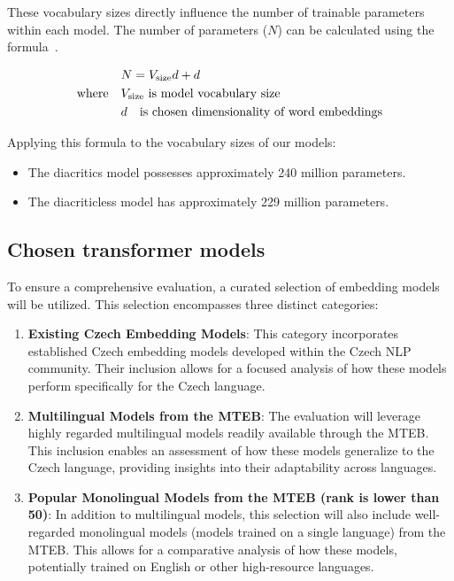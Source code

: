 These vocabulary sizes directly influence the number of trainable parameters within each model.
The number of parameters ($N$) can be calculated using the formula~.

\begin{align} \label{eq:cbow_parameters}
  & N = V_{\text{size}}d + d \\
  \text{where} \quad & V_{\text{size}} \text{ is model vocabulary size}  \notag \\
                      & d \quad \text{is chosen dimensionality of word embeddings} \notag
\end{align}
  
Applying this formula to the vocabulary sizes of our models:
\begin{itemize}
  \item The diacritics model possesses approximately 240 million parameters.
  \item The diacriticless model has approximately 229 million parameters.
\end{itemize}

\subsection{Chosen transformer models}
To ensure a comprehensive evaluation, a curated selection of embedding models will be utilized.
This selection encompasses three distinct categories:

\begin{enumerate}
  \item \textbf{Existing Czech Embedding Models}:
    This category incorporates established Czech embedding models developed within the Czech NLP community.
    Their inclusion allows for a focused analysis of how these models perform specifically for the Czech language.
  \item \textbf{Multilingual Models from the \ac{MTEB}}:
    The evaluation will leverage highly regarded multilingual models readily available through the \ac{MTEB}.
    This inclusion enables an assessment of how these models generalize to the Czech language, providing insights into their adaptability across languages.
  \item \textbf{Popular Monolingual Models from the \ac{MTEB} (rank is lower than 50)}:
    In addition to multilingual models, this selection will also include well-regarded monolingual models (models trained on a single language) from the \ac{MTEB}.
    This allows for a comparative analysis of how these models, potentially trained on English or other high-resource languages.
\end{enumerate}

